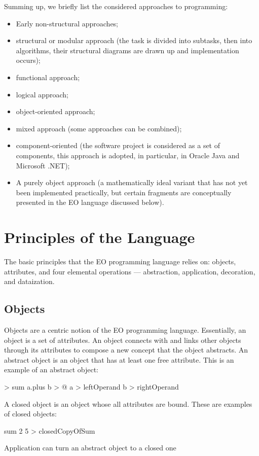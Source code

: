 \documentclass[12pt]{book}
\begin{document}
Summing up, we briefly list the considered approaches to programming:
\begin{itemize}
    \item Early non-structural approaches;
    \item structural or modular approach (the task is divided into subtasks, then into algorithms, their structural diagrams are drawn up and implementation occurs);
    \item functional  approach;
    \item logical approach;
    \item object-oriented approach;
    \item mixed approach (some approaches can be combined);
    \item component-oriented (the software project is considered as a set of components, this approach is adopted, in particular, in Oracle Java and Microsoft .NET);
    \item A purely object approach (a mathematically ideal variant that has not yet been implemented practically, but certain fragments are conceptually presented in the EO language discussed below).
\end{itemize}


\chapter{Principles of the Language}

The basic principles that the EO programming language relies on: objects, attributes, and four elemental operations — abstraction, application, decoration, and dataization.

\section{Objects}
Objects are a centric notion of the EO programming language. Essentially, an object is a set of attributes. An object connects with and links other objects through its attributes to compose a new concept that the object abstracts.
An abstract object is an object that has at least one free attribute.
This is an example of an abstract object:

\begin{ffcode}
[a b] > sum
  a.plus b > @
  a > leftOperand
  b > rightOperand
\end{ffcode}
A closed object is an object whose all attributes are bound.
These are examples of closed objects:

\begin{ffcode}
sum 2 5 > closedCopyOfSum
\end{ffcode}
Application can turn an abstract object to a closed one
\end{document}
